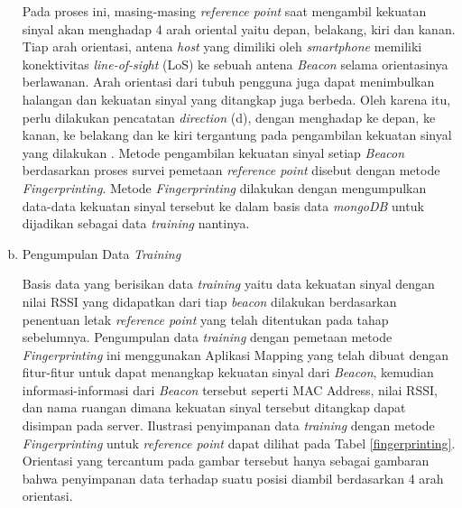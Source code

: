 \begin{enumerate}[a.]
	      \par Pada proses ini, masing-masing \textit{reference point} saat mengambil kekuatan sinyal akan menghadap 4 arah oriental yaitu depan, belakang, kiri dan kanan. Tiap arah orientasi, antena \textit{host} yang dimiliki oleh \textit{smartphone} memiliki konektivitas \textit{line-of-sight} (LoS) ke sebuah antena \textit{Beacon} selama orientasinya berlawanan. Arah orientasi dari tubuh pengguna juga dapat menimbulkan halangan dan kekuatan sinyal yang ditangkap juga berbeda. Oleh karena itu, perlu dilakukan pencatatan \textit{direction} (d), dengan menghadap ke depan, ke kanan, ke belakang dan ke kiri tergantung pada pengambilan kekuatan sinyal yang dilakukan \citep{christ1993}. Metode pengambilan kekuatan sinyal setiap \textit{Beacon} berdasarkan proses survei pemetaan \textit{reference point} disebut dengan metode \textit{Fingerprinting}. Metode \textit{Fingerprinting} dilakukan dengan mengumpulkan  data-data kekuatan sinyal tersebut ke dalam basis data \textit{mongoDB} untuk dijadikan sebagai data \textit{training} nantinya.

	\item Pengumpulan Data \textit{Training}
	      \par
	      Basis data yang berisikan data \textit {training} yaitu data kekuatan sinyal dengan nilai RSSI yang didapatkan dari tiap \textit{beacon} dilakukan berdasarkan penentuan letak \textit{reference point} yang telah ditentukan pada tahap sebelumnya. Pengumpulan data \textit{training} dengan pemetaan metode \textit{Fingerprinting} ini menggunakan Aplikasi Mapping yang telah dibuat dengan fitur-fitur untuk dapat menangkap kekuatan sinyal dari \textit{Beacon}, kemudian informasi-informasi dari \textit{Beacon} tersebut seperti MAC Address, nilai RSSI, dan nama ruangan dimana kekuatan sinyal tersebut ditangkap dapat disimpan pada server. Ilustrasi penyimpanan data \textit{training} dengan metode \textit{Fingerprinting} untuk \textit{reference point} dapat dilihat pada Tabel \ref{fingerprinting}. Orientasi yang tercantum pada gambar tersebut hanya sebagai gambaran bahwa penyimpanan data terhadap suatu posisi diambil berdasarkan 4 arah orientasi.


\end{enumerate}
